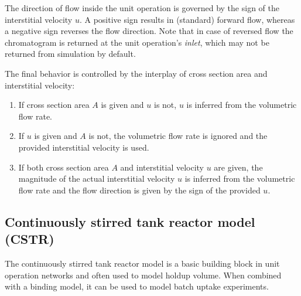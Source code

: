 The direction of flow inside the unit operation is governed by the sign of the interstitial velocity $u$.
A positive sign results in (standard) forward flow, whereas a negative sign reverses the flow direction.
Note that in case of reversed flow the chromatogram is returned at the unit operation's \emph{inlet}, which may not be returned from simulation by default.

The final behavior is controlled by the interplay of cross section area and interstitial velocity:
\begin{enumerate}
	\item If cross section area $A$ is given and $u$ is not, $u$ is inferred from the volumetric flow rate.
	\item If $u$ is given and $A$ is not, the volumetric flow rate is ignored and the provided interstitial velocity is used.
	\item If both cross section area $A$ and interstitial velocity $u$ are given, the magnitude of the actual interstitial velocity $u$ is inferred from the volumetric flow rate and the flow direction is given by the sign of the provided $u$.
\end{enumerate}

\subsection{Continuously stirred tank reactor model (CSTR)}\label{sec:MUOPCSTR}

The continuously stirred tank reactor model  is a basic building block in unit operation networks and often used to model holdup volume.
When combined with a binding model, it can be used to model batch uptake experiments.

